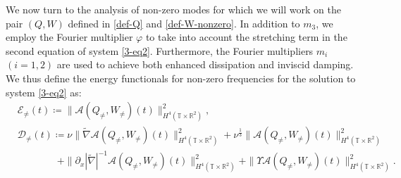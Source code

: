\documentclass[11pt,reqno]{article}
\numberwithin{equation}{section}
\newcommand\R{{\mathbb R}}
\newcommand\T{{\mathbb T}}
\newcommand\Z{{\mathbb Z}}
\newcommand\D{{\mathcal D}}
\newcommand\E{{\mathcal E}}
\newcommand\A{\mathcal{A}}
\newcommand \tri {\coloneqq}
\let\pa=\partial
\let\f=\frac
\begin{document}
We now turn to the analysis of non-zero modes for which we will work on the pair $(Q,W)$ defined in \eqref{def-Q} and \eqref{def-W-nonzero}.
In addition to $m_3$, we employ the Fourier multiplier $\varphi$ to take into account the stretching term in the second equation of system \eqref{3-eq2}.
Furthermore, the Fourier multipliers $m_i$ $(i=1,2)$ are used to achieve both enhanced dissipation and inviscid damping.
We thus define the energy functionals for non-zero frequencies for the solution to system \eqref{3-eq2} as:
\begin{align}
&\E_{\not=}(t)\tri   
\|\A (Q_{\not=},W_{\not=})(t)\|_{H^4(\T\times\R^2)}^2,
\label{defDnot-1}\\
&\D_{\not=}(t)\tri 
\nu \|\widetilde{\nabla}\A (Q_{\not=},W_{\not=})(t)\|_{H^4(\T\times\R^2)}^2
+\nu^{\f13} 
\|\A (Q_{\not=},W_{\not=})(t)\|_{H^4(\T\times\R^2)}^2
\nonumber\\
&\qquad\qquad
+\|\pa_x|\widetilde{\nabla}|^{-1}\A (Q_{\not=},W_{\not=})(t)\|_{H^4(\T\times\R^2)}^2
+\|\varUpsilon\A (Q_{\not=},W_{\not=})(t)\|_{H^4(\T\times\R^2)}^2.
\label{defDnot}
\end{align}


\medskip
\end{document}
